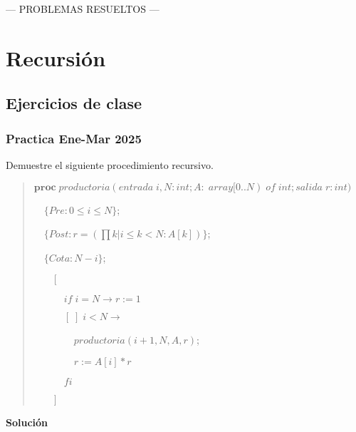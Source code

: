 \documentclass[hidelinks]{article}
\newenvironment{absolutelynopagebreak}
{\Needspace{10\baselineskip}\begin{quote}}
		{\end{quote}}
\begin{document}
\newpage
\vspace*{\fill}
\hspace*{\fill} --- PROBLEMAS RESUELTOS --- \hspace*{\fill}
\vspace*{\fill}
\thispagestyle{empty}
\newpage

\section{Recursión}

\subsection{Ejercicios de clase}\par

\subsubsection{Practica Ene-Mar 2025}

Demuestre el siguiente procedimiento recursivo.\par

\begin{absolutelynopagebreak}
	$\textbf{proc} \; productoria(entrada \; i, N: int; A: \; array[0..N) \; of \; int; salida \; r: int)$ \par
	$\quad \{Pre: 0 \leq i \leq N\}$;\par
	$\quad \{Post: r = (\prod k | i \leq k < N: A[k])\}$;\par
	$\quad \{Cota: N - i\}$;\par
	$\qquad [$\par
			$\qquad \quad if \; i = N \rightarrow r := 1$\par
			$\qquad \quad [\;] \; i < N \rightarrow $\par
			$\qquad \qquad productoria(i + 1, N, A, r)$;\par
			$\qquad \qquad r := A[i] * r $\par
			$\qquad \quad fi$\par
			$\qquad ]$\par
\end{absolutelynopagebreak}\par

\textbf{Solución}
\end{document}
